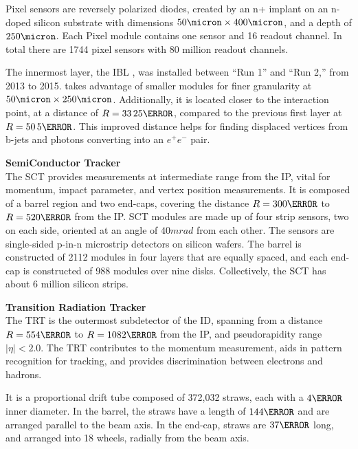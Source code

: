 Pixel sensors are reversely polarized diodes, created by an n+ implant on an n-doped silicon substrate with dimensions $ \unit{50}{\micron} \times \unit{400}{\micron}$, and a depth of $\unit{250}{\micron}$. Each Pixel module contains one sensor and 16 readout channel. In total there are 1744 pixel sensors with 80 million readout channels.
    
The innermost layer, the \gls{IBL} \cite{ibl-tdr}, was installed between ``Run 1'' and ``Run 2,'' from 2013 to 2015. takes advantage of smaller modules for finer granularity at $\unit{50}{\micron} \times \unit{250}{\micron}$. Additionally, it is located closer to the interaction point, at a distance of $R=\unit{33.25}{\mm}$, compared to the previous first layer at $R=\unit{50.5}{\mm}$. This improved distance helps for finding displaced vertices from b-jets and photons converting into an $e^+e^-$ pair.

\noindent\textbf{SemiConductor Tracker}\\
\indent The \gls{SCT} provides measurements at intermediate range from the \gls{IP}, vital for momentum, impact parameter, and vertex position measurements. It is composed of a barrel region and two end-caps, covering the distance $R=\unit{300}{\mm}$ to $R= \unit{520}{\mm}$ from the \gls{IP}. \gls{SCT} modules are made up of four strip sensors, two on each side, oriented at an angle of $\unit{40}{mrad}$ from each other. The sensors are single-sided p-in-n microstrip detectors on silicon wafers. The barrel is constructed of 2112 modules in four layers that are equally spaced, and each end-cap is constructed of 988 modules over nine disks. Collectively, the \gls{SCT} has about 6 million silicon strips.

\noindent\textbf{Transition Radiation Tracker}\\
\indent The \gls{TRT} is the outermost subdetector of the \gls{ID}, spanning from a distance $R=\unit{554}{\mm}$ to $R= \unit{1082}{\mm}$ from the \gls{IP}, and pseudorapidity range $|\eta| < 2.0$. The \gls{TRT} contributes to the momentum measurement, aids in pattern recognition for tracking, and provides discrimination between electrons and hadrons. 

It is a proportional drift tube composed of 372,032 straws, each with a $\unit{4}{\mm}$ inner diameter. In the barrel, the straws have a length of $\unit{144}{\cm}$ and are arranged parallel to the beam axis. In the end-cap, straws are $\unit{37}{\cm}$ long, and arranged into 18 wheels, radially from the beam axis.

